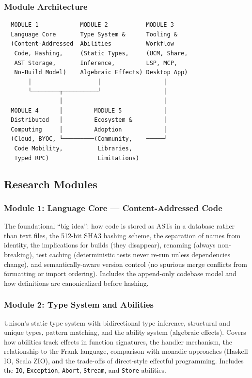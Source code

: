 \documentclass[11pt,letterpaper]{article}
\begin{document}
\subsubsection{Module Architecture}

\begin{asciibox}
\begin{verbatim}
  MODULE 1            MODULE 2           MODULE 3
  Language Core       Type System &      Tooling &
  (Content-Addressed  Abilities          Workflow
   Code, Hashing,     (Static Types,     (UCM, Share,
   AST Storage,       Inference,         LSP, MCP,
   No-Build Model)    Algebraic Effects) Desktop App)
       │                   │                  │
       └────────┬──────────┘                  │
                │                             │
  MODULE 4      │         MODULE 5            │
  Distributed   │         Ecosystem &         │
  Computing     │         Adoption            │
  (Cloud, BYOC, └─────────(Community,    ─────┘
   Code Mobility,          Libraries,
   Typed RPC)              Limitations)
\end{verbatim}
\end{asciibox}

\subsection{Research Modules}

\subsubsection{Module 1: Language Core --- Content-Addressed Code}
The foundational ``big idea'': how code is stored as ASTs in a database rather than text files, the 512-bit SHA3 hashing scheme, the separation of names from identity, the implications for builds (they disappear), renaming (always non-breaking), test caching (deterministic tests never re-run unless dependencies change), and semantically-aware version control (no spurious merge conflicts from formatting or import ordering). Includes the append-only codebase model and how definitions are canonicalized before hashing.

\subsubsection{Module 2: Type System and Abilities}
Unison's static type system with bidirectional type inference, structural and unique types, pattern matching, and the ability system (algebraic effects). Covers how abilities track effects in function signatures, the handler mechanism, the relationship to the Frank language, comparison with monadic approaches (Haskell IO, Scala ZIO), and the trade-offs of direct-style effectful programming. Includes the \texttt{IO}, \texttt{Exception}, \texttt{Abort}, \texttt{Stream}, and \texttt{Store} abilities.
\end{document}
